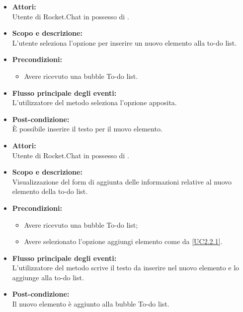 
\begin{itemize}
	\item \textbf{Attori:}
	\\Utente di Rocket.Chat in possesso di \ProjectName{}.
	\item \textbf{Scopo e descrizione:} 
	\\L'utente seleziona l'opzione per inserire un nuovo elemento alla to-do list.
	\item \textbf{Precondizioni:}
	\begin{itemize}
		\item Avere ricevuto una bubble To-do list.
	\end{itemize}
	\item \textbf{Flusso principale degli eventi:}
	\\L'utilizzatore del metodo seleziona l'opzione apposita.
	\item \textbf{Post-condizione:}
	\\È possibile inserire il testo per il nuovo elemento. 
\end{itemize}


\begin{itemize}
	\item \textbf{Attori:}
	\\Utente di Rocket.Chat in possesso di \ProjectName{}.
	\item \textbf{Scopo e descrizione:} 
	\\Visualizzazione del form di aggiunta delle informazioni relative al nuovo elemento della to-do list.
	\item \textbf{Precondizioni:}
	\begin{itemize}
		\item Avere ricevuto una bubble To-do list;
		\item Avere selezionato l'opzione aggiungi elemento come da \ref{UC2.2.1}.
	\end{itemize}
	\item \textbf{Flusso principale degli eventi:}
	\\L'utilizzatore del metodo scrive il testo da inserire nel nuovo elemento e lo aggiunge alla to-do list.
	\item \textbf{Post-condizione:}
	\\Il nuovo elemento è aggiunto alla bubble To-do list.
\end{itemize}

